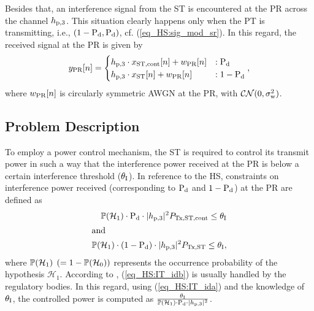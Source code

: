 Besides that, an interference signal from the ST is encountered at the PR across the channel $h_{\text{p,3}}$. This situation clearly happens only when the PT is transmitting, i.e., $(1 - \text{P}_{\text{d}}, \text{P}_{\text{d}})$, cf. (\ref{eq_HS:sig_mod_sr}). In this regard, the received signal at the PR is given by
\begin{equation}
y_{\text{PR}}[n] = 
\begin{cases}
h_{\text{p,3}} \cdot x_{\text{ST,cont}}[n] + w_{\text{PR}}[n] & : \text{P}_{\text{d}} \\
h_{\text{p,3}} \cdot x_{\text{ST}}[n] + w_{\text{PR}}[n] & : 1- \text{P}_{\text{d}} 
\end{cases},
\label{eq_HS:sig_mod_pr}
\end{equation}
where $w_{\text{PR}}[n]$ is circularly symmetric AWGN at the PR, with $\mathcal{CN}(0,\sigma^2_{\text{w}})$.

\subsection{Problem Description}
To employ a power control mechanism, the ST is required to control its transmit power in such a way that the interference power received at the PR is below a certain interference threshold ($\theta_{\text{I}}$). In reference to the HS, constraints on interference power received (corresponding to $\text{P}_{\text{d}}$ and $1 - \text{P}_{\text{d}}$) at the PR are defined as
\begin{align}
\mathbb P(\mathcal{H}_1) \cdot \text{P}_{\text{d}} \cdot |h_{\text{p,3}}|^2 P_{\text{Tx,ST,cont}} \le \theta_{\text{I}} \label{eq_HS:IT_ida} \\
\intertext{and   } 
\mathbb P(\mathcal{H}_1) \cdot (1 - \text{P}_{\text{d}}) \cdot |h_{\text{p,3}}|^2 P_{\text{Tx,ST}} \le \theta_{\text{I}} \label{eq_HS:IT_idb},
\end{align}
where $\mathbb P(\mathcal{H}_1)$ $(= 1 - \mathbb P(\mathcal{H}_0))$ represents the occurrence probability of the hypothesis $\mathcal H_1$. 
According to \cite{Sharma14}, (\ref{eq_HS:IT_idb}) is usually handled by the regulatory bodies. In this regard, using (\ref{eq_HS:IT_ida}) and the knowledge of $\theta_{\text{I}}$, the controlled power is computed as $\frac{\theta_{\text{I}}}{\mathbb P(\mathcal{H}_1) \cdot \text{P}_{\text{d}} \cdot |h_{\text{p,3}}|^2}$.

